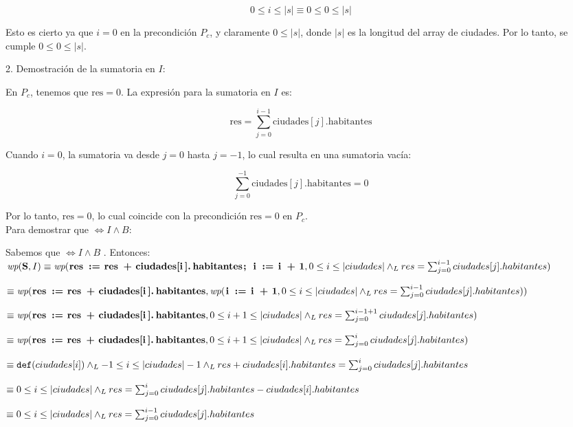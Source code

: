\documentclass[10pt,a4paper]{article}
\begin{document}
\[
0 \leq i \leq |s| \equiv 0 \leq 0 \leq |s|
\]

Esto es cierto ya que \( i = 0 \) en la precondición \( P_c \), y claramente \( 0 \leq |s| \), donde \( |s| \) es la longitud del array de ciudades. Por lo tanto, se cumple \( 0 \leq 0 \leq |s| \).

2. Demostración de la sumatoria en \( I \):

En \( P_c \), tenemos que \( \text{res} = 0 \). La expresión para la sumatoria en \( I \) es:

\[
\text{res} = \sum_{j=0}^{i-1} \text{ciudades}[j].\text{habitantes}
\]

Cuando \( i = 0 \), la sumatoria va desde \( j = 0 \) hasta \( j = -1 \), lo cual resulta en una sumatoria vacía:

\[
\sum_{j=0}^{-1} \text{ciudades}[j].\text{habitantes} = 0
\]

Por lo tanto, \( \text{res} = 0 \), lo cual coincide con la precondición \( \text{res} = 0 \) en \( P_c \).
\\

Para demostrar que   $\ensuremath{\iff I \land B}$: 

Sabemos que   $\ensuremath{\iff I \land B}$ \implica {}. Entonces:\\



$\wp{S}{I} \equiv  \wp{ res := res + ciudades[i].habitantes; i := i + 1}{0 \leq i \leq |ciudades| \yLuego res = \sum_{j=0}^{i-1} ciudades[j].habitantes} $

$\equiv  \wp{ res := res + ciudades[i].habitantes}{\wp{i := i + 1}{0 \leq i \leq |ciudades| \yLuego res = \sum_{j=0}^{i-1} ciudades[j].habitantes}} $

$\equiv  \wp{ res := res + ciudades[i].habitantes}{0 \leq i+1 \leq |ciudades| \yLuego res = \sum_{j=0}^{i-1 + 1} ciudades[j].habitantes} $

$\equiv  \wp{ res := res + ciudades[i].habitantes}{0 \leq i+1 \leq |ciudades| \yLuego res = \sum_{j=0}^{i} ciudades[j].habitantes} $

$\equiv  \text{\normalfont\ttfamily def}(ciudades[i]) \land _L -1 \leq i \leq |ciudades| -1 \land _L res + ciudades[i].habitantes = \sum_{j=0}^{i} ciudades[j].habitantes $

$\equiv  0 \leq i \leq |ciudades| \land _L res = \sum_{j=0}^{i} ciudades[j].habitantes - ciudades[i].habitantes $

$\equiv  0 \leq i \leq |ciudades|  \land _L res = \sum_{j=0}^{i-1} ciudades[j].habitantes $\\
\end{document}

